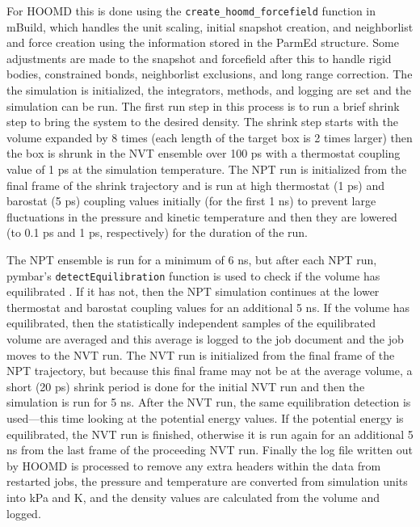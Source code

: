 For HOOMD this is done using the \lstinline{create_hoomd_forcefield} function in mBuild, which handles the unit scaling, initial snapshot creation, and neighborlist and force creation using the information stored in the ParmEd structure. 
Some adjustments are made to the snapshot and forcefield after this to handle rigid bodies, constrained bonds, neighborlist exclusions, and long range correction. 
The the simulation is initialized, the integrators, methods, and logging are set and the simulation can be run. 
The first run step in this process is to run a brief shrink step to bring the system to the desired density. 
The shrink step starts with the volume expanded by 8 times (each length of the target box is 2 times larger) then the box is shrunk in the NVT ensemble over 100 ps with a thermostat coupling value of 1 ps at the simulation temperature. 
The NPT run is initialized from the final frame of the shrink trajectory and is run at high thermostat (1 ps) and barostat (5 ps) coupling values initially (for the first 1 ns) to prevent large fluctuations in the pressure and kinetic temperature and then they are lowered (to 0.1 ps and 1 ps, respectively) for the duration of the run. %

The NPT ensemble is run for a minimum of 6 ns, but after each NPT run, pymbar's \lstinline{detectEquilibration} function is used to check if the volume has equilibrated \cite{Chodera2007, Chodera2016, Shirts2008a}. 
If it has not, then the NPT simulation continues at the lower thermostat and barostat coupling values for an additional 5 ns. 
If the volume has equilibrated, then the statistically independent samples of the equilibrated volume are averaged and this average is logged to the job document and the job moves to the NVT run. 
The NVT run is initialized from the final frame of the NPT trajectory, but because this final frame may not be at the average volume, a short (20 ps) shrink period is done for the initial NVT run and then the simulation is run for 5 ns. 
After the NVT run, the same equilibration detection is used---this time looking at the potential energy values. If the potential energy is equilibrated, the NVT run is finished, otherwise it is run again for an additional 5 ns from the last frame of the proceeding NVT run. 
Finally the log file written out by HOOMD is processed to remove any extra headers within the data from restarted jobs, the pressure and temperature are converted from simulation units into kPa and K, and the density values are calculated from the volume and logged.

